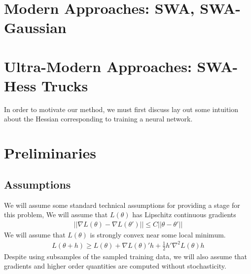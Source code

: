 \documentclass{article}
\begin{document}







\section{Modern Approaches: SWA, SWA-Gaussian}


\section{Ultra-Modern Approaches: SWA-Hess Trucks}

In order to motivate our method, we must first discuss lay out some intuition about the Hessian corresponding to training a neural network.



\section{Preliminaries}

\subsection{Assumptions}
We will assume some standard technical assumptions for providing a stage for this problem,
We will assume that $L(\theta)$ has Lipschitz continuous gradients
\begin{gather*}
||\nabla L(\theta) - \nabla L(\theta')|| \leq C||\theta - \theta'||
\end{gather*}
We will assume that $L(\theta)$ is strongly convex near some local minimum.
\begin{gather*}
L(\theta + h) \geq L(\theta) + \nabla L(\theta)'h + \frac{1}{2}h'\nabla^2L(\theta)h
\end{gather*}
Despite using subsamples of the sampled training data, we will also assume that gradients and higher order quantities are computed without stochasticity.
\end{document}
